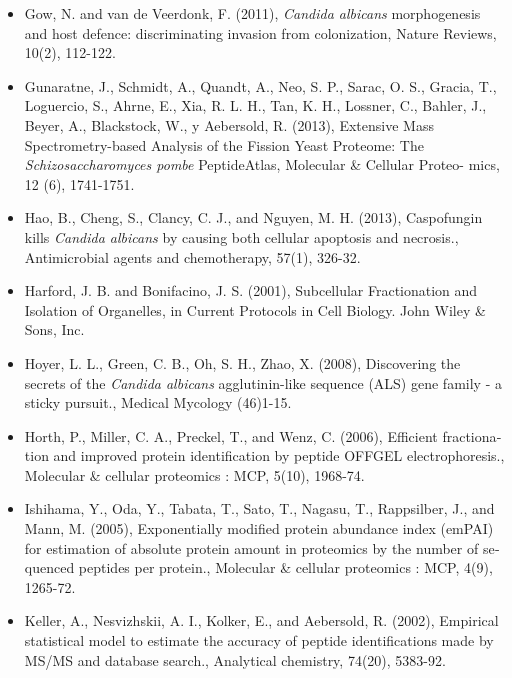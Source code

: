 \begin{otherlanguage}{british}
\begin{itemize}[leftmargin=*]
\item[]{%
Gow, N. and van de Veerdonk, F. (2011), \textit{Candida albicans} morphogenesis and host defence:
discriminating invasion from colonization, Nature Reviews, 10(2), 112-122.
}

\item[]{
Gunaratne, J., Schmidt, A., Quandt, A., Neo, S. P., Sarac, O. S., Gracia, T., Loguercio, S.,
Ahrne, E., Xia, R. L. H., Tan, K. H., Lossner, C., Bahler, J., Beyer, A., Blackstock, W., y
Aebersold, R. (2013), Extensive Mass Spectrometry-based Analysis of the Fission Yeast
Proteome: The \textit{Schizosaccharomyces pombe} PeptideAtlas, Molecular \& Cellular Proteo-
mics, 12 (6), 1741-1751.
}

\item[]{%
Hao, B., Cheng, S., Clancy, C. J., and Nguyen, M. H. (2013), Caspofungin kills 
\textit{Candida albicans} by causing both cellular apoptosis and necrosis.,
Antimicrobial agents and chemotherapy, 57(1), 326-32.
}

\item[]{%
Harford, J. B. and Bonifacino, J. S. (2001), 
Subcellular Fractionation and Isolation of Organelles,
in Current Protocols in Cell Biology. John Wiley \& Sons, Inc.
}

\item[]{
Hoyer, L. L., Green, C. B., Oh, S. H., Zhao, X.  (2008),
Discovering the secrets of the \textit{Candida albicans} agglutinin-like sequence (ALS) gene family - a sticky pursuit., 
Medical Mycology (46)1-15.
}

\item[]{%
Horth, P., Miller, C. A., Preckel, T., and Wenz, C. (2006), Efficient fractionation and improved
protein identification by peptide OFFGEL electrophoresis., Molecular \& cellular proteomics
: MCP, 5(10), 1968-74.
}

\item[]{%
Ishihama, Y., Oda, Y., Tabata, T., Sato, T., Nagasu, T., Rappsilber, J., and Mann, M. (2005),
Exponentially modified protein abundance index (emPAI) for estimation of absolute protein
amount in proteomics by the number of sequenced peptides per protein., 
Molecular \& cellular proteomics : MCP, 4(9), 1265-72.
}

\item[]{%
Keller, A., Nesvizhskii, A. I., Kolker, E., and Aebersold, R. (2002), Empirical statistical model
to estimate the accuracy of peptide identifications made by MS/MS and database search.,
Analytical chemistry, 74(20), 5383-92.
}


\end{itemize}
\end{otherlanguage}
